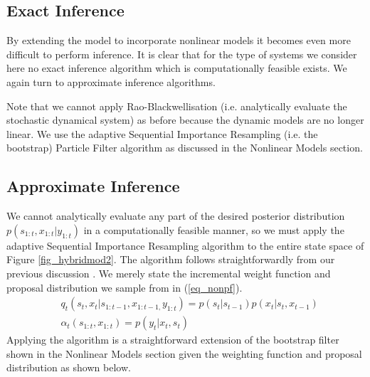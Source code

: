 \documentclass[../masters.tex]{subfiles}
\begin{document}
\subsection{Exact Inference}
By extending the model to incorporate nonlinear models it becomes even more difficult to perform inference. It is clear that for the type of systems we consider here no exact inference algorithm which is computationally feasible exists. We again turn to approximate inference algorithms.

Note that we cannot apply Rao-Blackwellisation (i.e. analytically evaluate the stochastic dynamical system) as before because the dynamic models are no longer linear. We use the adaptive Sequential Importance Resampling (i.e. the bootstrap) Particle Filter algorithm as discussed in the Nonlinear Models section.

\subsection{Approximate Inference}
We cannot analytically evaluate any part of the desired posterior distribution $p(s_{1:t}, x_{1:t}|y_{1:t})$ in a computationally feasible manner, so we must apply the adaptive Sequential Importance Resampling algorithm to the entire state space of Figure \ref{fig_hybridmod2}. The algorithm follows straightforwardly from our previous discussion \cite{murphy1}. We merely state the incremental weight function and proposal distribution we sample from in (\ref{eq_nonpf}). 
\begin{equation}
\begin{aligned}
&q_t(s_t,x_t|s_{1:t-1},x_{1:t-1,}y_{1:t}) = p(s_t|s_{t-1})p(x_t|s_t,x_{t-1}) \\
&\alpha_t(s_{1:t},x_{1:t}) = p(y_t|x_t,s_t)
\end{aligned}
\label{eq_nonpf}
\end{equation}  
Applying the algorithm is a straightforward extension of the bootstrap filter shown in the Nonlinear Models section given the weighting function and proposal distribution as shown below.
\end{document}

